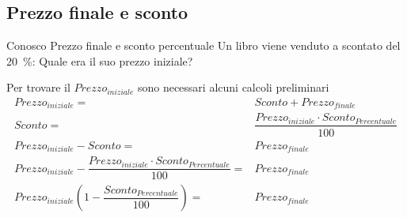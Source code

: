 \subsection{Prezzo finale e sconto}
	\begin{esempiot}{Conosco Prezzo finale e sconto percentuale}{}
Un libro viene venduto a  scontato del \SI{20}{\percent}: Quale era il suo prezzo iniziale?
\end{esempiot}
Per trovare il ${Prezzo}_{iniziale}$ sono necessari alcuni calcoli preliminari
\begin{align*}
	{Prezzo}_{iniziale}=&Sconto+{Prezzo}_{finale}\\
		Sconto=&\dfrac{{Prezzo}_{iniziale}\cdot {Sconto}_{Percentuale} }{100}\\
		{Prezzo}_{iniziale}-Sconto=&{Prezzo}_{finale}\\
	{Prezzo}_{iniziale}-\dfrac{{Prezzo}_{iniziale}\cdot {Sconto}_{Percentuale} }{100}=&{Prezzo}_{finale}\\
	{Prezzo}_{iniziale}\left(1-\dfrac{{Sconto}_{Percentuale} }{100}\right)=&{Prezzo}_{finale}
\end{align*}